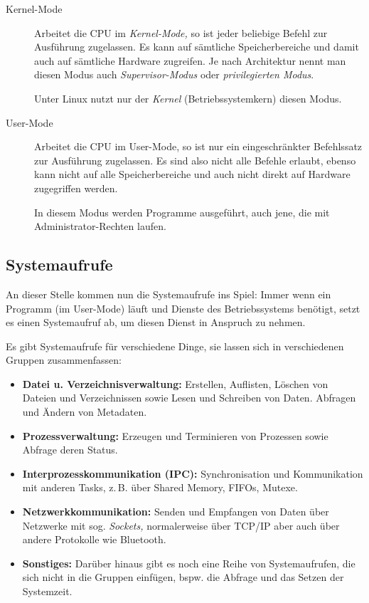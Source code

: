 \documentclass[10pt,DIV=15,twocolumn,ngerman,parskip=half]{scrartcl}
\begin{document}
\begin{description}
  \item[Kernel-Mode]
    Arbeitet die CPU im \emph{Kernel-Mode,} so ist jeder beliebige Befehl zur Ausführung 
    zugelassen. Es kann auf sämtliche Speicherbereiche und damit auch auf sämtliche Hardware 
    zugreifen. Je nach Architektur nennt man diesen Modus auch \emph{Supervisor-Modus} oder
    \emph{privilegierten Modus}.

    Unter Linux nutzt nur der \emph{Kernel} (Betriebssystemkern) diesen Modus.

  \item[User-Mode] Arbeitet die CPU im User-Mode, so ist nur ein eingeschränkter Befehlssatz zur
     Ausführung zugelassen. Es sind also nicht alle Befehle erlaubt, ebenso kann nicht auf alle Speicherbereiche und auch nicht direkt auf Hardware zugegriffen werden. 

     In diesem Modus werden Programme ausgeführt, auch jene, die mit Administrator-Rechten laufen.
\end{description}

\subsection{Systemaufrufe}

An dieser Stelle kommen nun die Systemaufrufe ins Spiel: Immer wenn ein Programm (im User-Mode)
läuft und Dienste des Betriebssystems benötigt, setzt es einen Systemaufruf ab, um diesen Dienst
in Anspruch zu nehmen.

Es gibt Systemaufrufe für verschiedene Dinge, sie lassen sich in verschiedenen Gruppen
zusammenfassen:

\begin{itemize}
  \item \textbf{Datei u. Verzeichnisverwaltung:} Erstellen, Auflisten, Löschen von Dateien und 
    Verzeichnissen sowie Lesen und Schreiben von Daten. Abfragen und Ändern von Metadaten.
  \item \textbf{Prozessverwaltung:} Erzeugen und Terminieren von Prozessen sowie Abfrage deren 
   Status.
  \item \textbf{Interprozesskommunikation (IPC):} Synchronisation und Kommunikation mit anderen Tasks, z.\,B. über Shared Memory, FIFOs, Mutexe.
  \item \textbf{Netzwerkkommunikation:} Senden und Empfangen von Daten über Netzwerke mit sog.
   \emph{Sockets,} normalerweise über TCP/IP aber auch über andere Protokolle wie Bluetooth.
  \item \textbf{Sonstiges:} Darüber hinaus gibt es noch eine Reihe von Systemaufrufen, die sich
    nicht in die Gruppen einfügen, bspw. die Abfrage und das Setzen der Systemzeit.
\end{itemize}
\end{document}
